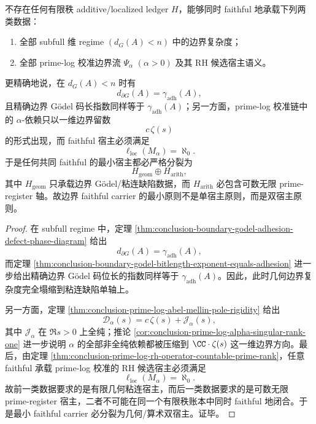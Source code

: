 \begin{theorem}\label{thm:conclusion-boundary-faithful-carriers-double-host-splitting}
不存在任何有限秩 additive/localized ledger \(H\)，能够同时 faithful 地承载下列两类数据：
\begin{enumerate}
  \item 全部 subfull 维 regime \((d_G(A)<n)\) 中的边界复杂度；
  \item 全部 prime-log 校准边界流 \(\Psi_\alpha\) \((\alpha>0)\) 及其 RH 候选宿主语义。
\end{enumerate}
更精确地说，在 \(d_G(A)<n\) 时有
\[
d_{\partial G}(A)=\gamma_{\mathrm{adh}}(A),
\]
且精确边界 Gödel 码长指数同样等于 \(\gamma_{\mathrm{adh}}(A)\)；另一方面，prime-log 校准链中的 \(\alpha\)-依赖只以一维边界留数
\[
c\,\zeta(s)
\]
的形式出现，而 faithful 宿主必须满足
\[
\ell_{\mathrm{loc}}(M_\alpha)=\aleph_0.
\]
于是任何共同 faithful 的最小宿主都必严格分裂为
\[
H_{\mathrm{geom}}\oplus H_{\mathrm{arith}},
\]
其中 \(H_{\mathrm{geom}}\) 只承载边界 Gödel/粘连缺陷数据，而 \(H_{\mathrm{arith}}\) 必包含可数无限 prime-register 轴。故边界 faithful carrier 的最小原则不是单宿主原则，而是双宿主原则。
\end{theorem}

\begin{proof}
在 subfull regime 中，定理 \ref{thm:conclusion-boundary-godel-adhesion-defect-phase-diagram} 给出
\[
d_{\partial G}(A)=\gamma_{\mathrm{adh}}(A),
\]
而定理 \ref{thm:conclusion-boundary-godel-bitlength-exponent-equals-adhesion} 进一步给出精确边界 Gödel 码位长的指数同样等于 \(\gamma_{\mathrm{adh}}(A)\)。因此，此时几何边界复杂度完全塌缩到粘连缺陷单轴上。

另一方面，定理 \ref{thm:conclusion-prime-log-abel-mellin-pole-rigidity} 给出
\[
\mathcal D_\alpha(s)=c\,\zeta(s)+\mathcal J_\alpha(s),
\]
其中 \(\mathcal J_\alpha\) 在 \(\Re s>0\) 上全纯；推论 \ref{cor:conclusion-prime-log-alpha-singular-rank-one} 进一步说明 \(\alpha\) 的全部非全纯依赖都被压缩到 \(\CC\cdot \zeta(s)\) 这一维边界方向。最后，由定理 \ref{thm:conclusion-prime-log-rh-operator-countable-prime-rank}，任意 faithful 承载 prime-log 校准的 RH 候选宿主必须满足
\[
\ell_{\mathrm{loc}}(M_\alpha)=\aleph_0.
\]
故前一类数据要求的是有限几何粘连宿主，而后一类数据要求的是可数无限 prime-register 宿主，二者不可能在同一个有限秩账本中同时 faithful 地闭合。于是最小 faithful carrier 必分裂为几何/算术双宿主。证毕。
\end{proof}

